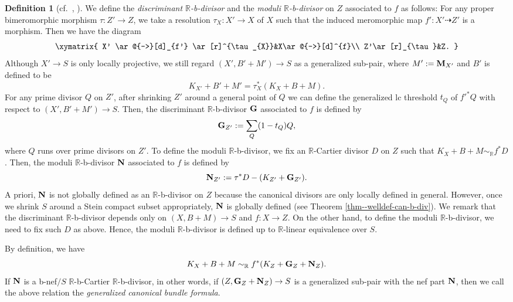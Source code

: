 \documentclass[12pt]{amsart}
\theoremstyle{definition}
\newtheorem{defn}[thm]{Definition}
\begin{document}
\begin{defn}[{cf.~\cite[Section 4]{filipazzi-gen-can-bundle-formula}, \cite[Subsection 2.5]{filipazzi-svaldi}}]
We define the {\em discriminant $\mathbb{R}$-b-divisor} and the {\em moduli $\mathbb{R}$-b-divisor} on $Z$ associated to $f$ as follows: 
For any proper bimeromorphic morphism $\tau \colon Z' \to Z$, we take a resolution $\tau_{X} \colon X' \to X$ of $X$ such that the induced meromorphic map $f' \colon X' \dashrightarrow Z'$ is a morphism. 
Then we have the diagram
 $$
\xymatrix{
X' \ar@{->}[d]_{f'} \ar[r]^{\tau_{X}}&X\ar@{->}[d]^{f}\\
Z'\ar[r]_{\tau}&Z. 
}
$$
Although $X' \to S$ is only locally projective, we still regard $(X',B'+M') \to S$ as a generalized sub-pair, where $M':=\boldsymbol{\rm M}_{X'}$ and $B'$ is defined to be 
$$K_{X'}+B'+M'=\tau_{X}^{*}(K_{X}+B+M).$$
For any prime divisor $Q$ on $Z'$, after shrinking $Z'$ around a general point of $Q$ we can define the generalized lc threshold $t_{Q}$ of $f'^{*}Q$ with respect to $(X',B'+M')\to S$. 
Then, the discriminant $\mathbb{R}$-b-divisor $\boldsymbol{\rm G}$ associated to $f$ is defined by 
$$\boldsymbol{\rm G}_{Z'}:=\sum_{Q}(1-t_{Q})Q,$$
where $Q$ runs over prime divisors on $Z'$. 
To define the moduli $\mathbb{R}$-b-divisor, we fix an $\mathbb{R}$-Cartier divisor $D$ on $Z$ such that $K_{X}+B+M\sim_{\mathbb{R}}f^{*}D$. 
Then, the moduli $\mathbb{R}$-b-divisor $\boldsymbol{\rm N}$ associated to $f$ is defined by 
$$\boldsymbol{\rm N}_{Z'}:= \tau^{*}D-(K_{Z'}+\boldsymbol{\rm G}_{Z'}).$$
A priori, $\boldsymbol{\rm N}$ is not globally defined as an $\mathbb{R}$-b-divisor on $Z$ because the canonical divisors are only locally defined in general. 
However, once we shrink $S$ around a Stein compact subset appropriately, $\boldsymbol{\rm N}$ is globally defined (see Theorem \ref{thm--welldef-can-b-div}).  
We remark that the discriminant $\mathbb{R}$-b-divisor depends only on $(X,B+M)\to S$ and $f \colon X \to Z$. 
On the other hand, to define the moduli $\mathbb{R}$-b-divisor, we need to fix such $D$ as above. 
Hence, the moduli $\mathbb{R}$-b-divisor is defined up to $\mathbb{R}$-linear equivalence over $S$. 

By definition, we have
$$K_{X}+B+M\sim_{\mathbb{R}}f^{*}(K_{Z}+\boldsymbol{\rm G}_{Z}+\boldsymbol{\rm N}_{Z}).$$
If $\boldsymbol{\rm N}$ is a b-nef$/S$ $\mathbb{R}$-b-Cartier $\mathbb{R}$-b-divisor, in other words, if $(Z, \boldsymbol{\rm G}_{Z}+\boldsymbol{\rm N}_{Z}) \to S$ is a generalized sub-pair with the nef part $\boldsymbol{\rm N}$, then we call the above relation the {\em generalized canonical bundle formula}.  
\end{defn}
\end{document}
